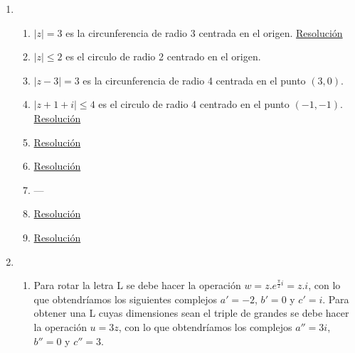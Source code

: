 \documentclass[a4paper]{article}
\newcommand{\exercise}{\item}
\newcommand{\df}[2]{\displaystyle\frac{#1}{#2}}
\begin{document}
\begin{enumerate}
\begin{enumerate} [label=(\alph*)]
		\item $z=2+i$ y $z=-3+i$
		\item \href{https://youtu.be/plpDsgzooH4}{Resolución}
		\item $z^5-1=0$
		\item \href{https://youtu.be/8z_3vpIabLI}{Resolución}
		\item $z \in \{2,-2,2i,-2i\}$
		\item \href{https://youtu.be/7ggnxlrUnrk}{Resolución}
		\item Dado $z=a+bi$ la primera condición implica que $a+bi+a-bi=2a=4$, es decir, $a=2$. Sabiendo que $z=2+bi$ aplicamos la segunda condición $|z|=\sqrt{2^2+b^2}=3$, de lo que se puede despejar que $b=\pm\sqrt(5)$. Los números complejos posibles son $z=2+\sqrt{5}i$ y $z=2-\sqrt{5}i$.
		\item Aplicando Bhaskara obtenemos $z_{1,2}=\df{-4i\pm\sqrt{(4i)^2-4.1.(-8)}}{2.1}=-2i\pm2$
		\item Aplicamos Bhaskara considerando solo la raíz positiva $z_{1,2}=\df{(3+i)+\sqrt{(-3-i)^2-4.1.(2+1)}}{2.1}=\df{3+i+\sqrt{-2i}}{2}$. Calculamos las raíces cuadradas de $-2i$ con la fórmula de Moivre y obtenemos $-1+i$ y $1-i$. Reemplazamos cada raíz en la fórmula de Bhaskara y obtenemos $z_1=\df{3+i-1+i}{2}=1+i$ y $z_1=\df{3+i+1-i}{2}=2$.
\end{enumerate}\exercise\begin{enumerate} [label=(\alph*)]		\item $|z|=3$ es la circunferencia de radio 3 centrada en el origen. \href{https://youtu.be/AQVEp9ncSwQ}{Resolución}
		\item $|z|\leq 2$ es el circulo de radio 2 centrado en el origen.
		\item $|z-3| = 3$ es la circunferencia de radio 4 centrada en el punto $(3,0)$.
		\item $|z+1+i| \leq 4$ es el circulo de radio 4 centrado en el punto $(-1,-1)$. \href{https://youtu.be/Rj6VfY1fLzw}{Resolución}
		\item \href{https://youtu.be/5OHpMCsd8iE}{Resolución}
		\item \href{https://youtu.be/OhXOvWcryMI}{Resolución}
\item ---		\item \href{https://youtu.be/9pxsYXL6k88}{Resolución}
		\item \href{https://youtu.be/3m1ZDSuXsX8}{Resolución}
\end{enumerate}\exercise\begin{enumerate} [label=(\alph*)]		\item Para rotar la letra L se debe hacer la operación $w=z.e^{\frac{\pi}{2}i}=z.i$, con lo que obtendríamos los siguientes complejos $a'=-2$, $b'=0$ y $c'=i$. Para obtener una L cuyas dimensiones sean el triple de grandes se debe hacer la operación $u=3z$, con lo que obtendríamos los complejos $a''=3i$, $b''=0$ y $c''=3$. 

\end{enumerate}
\end{enumerate}
\end{document}
